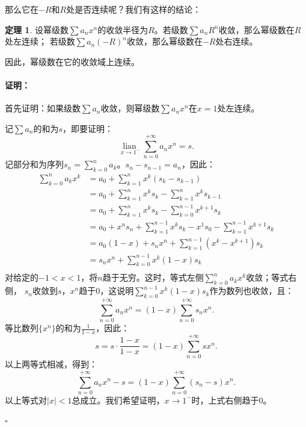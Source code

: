 \documentclass[12pt,UTF8]{ctexbook}
\newcommand{\lian}[1]{
    \underset{#1}{\operatorname{lian}\,}
}
\theoremstyle{definition}
\newtheorem{tm}{定理}[section]
\theoremstyle{plain}
\renewenvironment{proof}{\paragraph{\textbf{证明：}}}{\hfill$\square$}
\begin{document}
\begin{appendix}
那么它在$-R$和$R$处是否连续呢？我们有这样的结论：

\begin{tm}
    设幂级数$\sum a_n x^n$的收敛半径为$R$。若级数$\sum a_n R^n$收敛，那么幂级数在$R$处左连续；
    若级数$\sum a_n (-R)^n$收敛，那么幂级数在$-R$处右连续。
\end{tm}

因此，幂级数在它的收敛域上连续。

\begin{proof}
    首先证明：如果级数$\sum a_n$收敛，则幂级数$\sum a_n x^n$在$x = 1$处左连续。

    记$\sum a_n$的和为$s$，即要证明：
    $$ \lian{x\to 1^-} \sum_{n=0}^{+\infty}a_n x^n = s. $$
    记部分和为序列$ s_n = \sum_{k=0}^{n} a_k$。$s_{n} - s_{n-1} = a_n$，因此：
    \begin{align*}
        \sum_{k=0}^{n} a_k x^k &= a_0 + \sum_{k=1}^{n} x^k (s_k - s_{k-1}) \\
        &= a_0 + \sum_{k=1}^{n} x^k s_k - \sum_{k=1}^{n} x^k s_{k-1} \\
        &= a_0 + \sum_{k=1}^{n} x^k s_k - \sum_{k=0}^{n-1} x^{k+1} s_k \\
        &= a_0 + x^n s_n + \sum_{k=1}^{n-1} x^k s_k - x^1 s_0 - \sum_{k=1}^{n-1} x^{k+1} s_k \\
        &= a_0(1 - x) + s_n x^n + \sum_{k=1}^{n-1} (x^k - x^{k+1}) s_k \\
        &= s_n x^n + \sum_{k=0}^{n-1} x^k(1 - x) s_k \\
    \end{align*}
    对给定的$-1<x<1$，将$n$趋于无穷。这时，等式左侧$\sum_{k=0}^{n} a_k x^k$收敛；等式右侧，
    $s_n$收敛到$s$，$x^n$趋于$0$，这说明$\sum_{k=0}^{n-1} x^k(1 - x) s_k$作为数列也收敛，且：
    $$ \sum_{n=0}^{+\infty}a_n x^n = (1 - x)\sum_{n=0}^{+\infty}s_n x^n.$$
    等比数列$\{x^n\}$的和为$\frac{1}{1 - x}$，因此：
    $$ s = s \cdot \frac{1 - x}{1 - x} = (1 - x)\sum_{n=0}^{+\infty} s x^n. $$
    以上两等式相减，得到：
    $$ \sum_{n=0}^{+\infty}a_n x^n - s = (1 - x)\sum_{n=0}^{+\infty}(s_n - s) x^n.$$
    以上等式对$|x|<1$总成立。我们希望证明，$x\to 1^-$时，上式右侧趋于$0$。


\end{proof}
\end{appendix}
\end{document}
